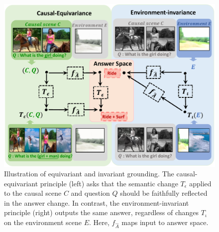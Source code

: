 \begin{figure}[t]
\centering
\includegraphics[scale=0.47]{fig/f1.pdf}
\vspace{-15pt}
\caption{
Illustration of equivariant and invariant grounding.
The causal-equivariant principle (left) asks that the semantic change $T_{\epsilon}$ applied to the causal scene $C$ and question $Q$ should be faithfully reflected in the answer change.
In contrast, the environment-invariant principle (right) outputs the same answer, regardless of changes $T_{\iota}$ on the environment scene $E$.
Here, $f_{\hat{A}}$ maps input to answer space.
}
\vspace{-15pt}
\label{fig:overview}
\end{figure}


